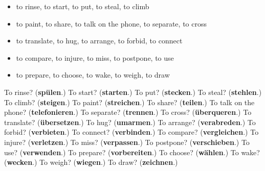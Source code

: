 \begin{itemize}
\raggedright
  \item to rinse, to start, to put, to steal, to climb
  \item to paint, to share, to talk on the phone, to separate, to cross
  \item to translate, to hug, to arrange, to forbid, to connect
  \item to compare, to injure, to miss, to postpone, to use
  \item to prepare, to choose, to wake, to weigh, to draw
\end{itemize}

\begin{tcolorbox}[breakable,colback=teal!4,colframe=teal!35!black,title={Before you move on}]
To rinse? (\textbf{spülen}.) To start? (\textbf{starten}.) To put? (\textbf{stecken}.) To steal? (\textbf{stehlen}.) To climb? (\textbf{steigen}.) To paint? (\textbf{streichen}.) To share? (\textbf{teilen}.) To talk on the phone? (\textbf{telefonieren}.) To separate? (\textbf{trennen}.) To cross? (\textbf{überqueren}.) To translate? (\textbf{übersetzen}.) To hug? (\textbf{umarmen}.) To arrange? (\textbf{verabreden}.) To forbid? (\textbf{verbieten}.) To connect? (\textbf{verbinden}.) To compare? (\textbf{vergleichen}.) To injure? (\textbf{verletzen}.) To miss? (\textbf{verpassen}.) To postpone? (\textbf{verschieben}.) To use? (\textbf{verwenden}.) To prepare? (\textbf{vorbereiten}.) To choose? (\textbf{wählen}.) To wake? (\textbf{wecken}.) To weigh? (\textbf{wiegen}.) To draw? (\textbf{zeichnen}.)
\end{tcolorbox}
